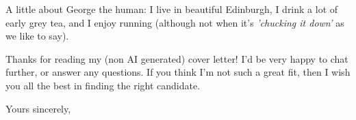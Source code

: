 \documentclass[a4paper, 10pt]{letter}
\begin{document}
\begin{letter}{}
A little about George the human: I live in beautiful Edinburgh, I drink a lot of early
grey tea, and I enjoy running (although not when it's \emph{'chucking it down'} as we
like to say).

Thanks for reading my (non AI generated) cover letter! I'd be very happy to
chat further, or answer any questions. If you think I'm not such a great fit,
then I wish you all the best in finding the right candidate.

\closing{Yours sincerely,}

\end{letter}
\end{document}
